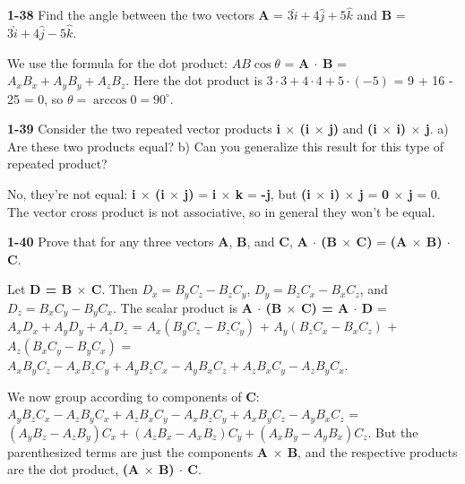 \documentclass{amsart}
\begin{document}
\vspace{\baselineskip}

\noindent
\textbf{1-38} Find the angle between the two vectors \textbf{A} = $3 \hat i + 4 \hat j + 5 \hat k$
and \textbf{B} = $3 \hat i + 4 \hat j - 5 \hat k$.

We use the formula for the dot product:
$A B \cos \theta$ = \textbf{A $\cdot$ B} = $A_x B_x + A_y B_y + A_z B_z$.
Here the dot product is $3 \cdot 3 + 4 \cdot 4 + 5 \cdot (-5)$ = 9 + 16 - 25 = 0,
so $\theta = \arccos 0 = 90^\circ$.

\vspace{\baselineskip}

\noindent
\textbf{1-39} Consider the two repeated vector products \textbf{i $\times$ (i $\times$ j)}
and \textbf{(i $\times$ i) $\times$ j}.\newline
a) Are these two products equal?\newline
b) Can you generalize this result for this type of repeated product?

No, they're not equal:  \textbf{i $\times$ (i $\times$ j)} =
\textbf{i $\times$ k} = \textbf{-j},
but \textbf{(i $\times$ i) $\times$ j} = \textbf{0 $\times$ j} = 0.
The vector cross product is not associative, so in general they won't be equal.

\vspace{\baselineskip}

\noindent
\textbf{1-40} Prove that for any three vectors \textbf{A}, \textbf{B}, and \textbf{C},
\textbf{A $\cdot$ (B $\times$ C)} = \textbf{(A $\times$ B) $\cdot$ C}.

Let \textbf{D = B $\times$ C}.  Then $D_x = B_y C_z - B_z C_y$, $D_y = B_z C_x - B_x C_z$, and $D_z = B_x C_y - B_y C_x$.
The scalar product is \textbf{A $\cdot$ (B $\times$ C) = A $\cdot$ D} = $A_x D_x + A_y D_y + A_z D_z$ =
$A_x (B_y C_z - B_z C_y)$ + $A_y (B_z C_x - B_x C_z)$ + $A_z (B_x C_y - B_y C_x)$ =
$A_x B_y C_z - A_x B_z C_y + A_y B_z C_x - A_y B_x C_z + A_z B_x C_y - A_z B_y C_x$.

We now group according to components of \textbf{C}:
$A_y B_z C_x - A_z B_y C_x + A_z B_x C_y - A_x B_z C_y + A_x B_y C_z - A_y B_x C_z$ =
$(A_y B_z - A_z B_y) C_x + (A_z B_x - A_x B_z) C_y + (A_x B_y - A_y B_x) C_z$.
But the parenthesized terms are just the components \textbf{A $\times$ B},
and the respective products are the dot product, \textbf{(A $\times$ B) $\cdot$ C}.

\clearpage

\end{document}
